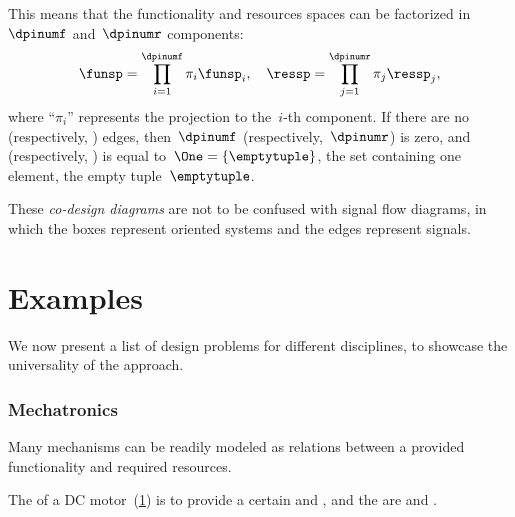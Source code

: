 
This means that the functionality and resources spaces can be factorized in~$\dpinumf$ and~$\dpinumr$ components:
\begin{equation*}
    \funsp=\prod_{i=1}^{\dpinumf}\pi_{i}\funsp_{i},\quad \ressp=\prod_{j=1}^{\dpinumr}\pi_{j}\ressp_{j},
\end{equation*}
where ``$\pi_{i}$'' represents the projection to the~$i$-th component.
If there are no  (respectively, ) edges, then~$\dpinumf$ (respectively,~$\dpinumr$) is zero, and \funsp (respectively, \ressp) is equal to~$\One=\{\emptytuple \}$, the set containing one element, the empty tuple~$\emptytuple$.

These \emph{co-design diagrams} are not to be confused with signal flow diagrams, in which the boxes represent oriented systems and the edges represent signals.




\section{Examples}
We now present a list of design problems for different disciplines, to showcase the universality of the approach.

\subsubsection{Mechatronics}
Many mechanisms can be readily modeled as relations between a provided functionality and required resources.

\begin{example}
    The  of a DC motor~(\cref{fig:dc_motor}) is to provide a certain  and , and the  are  and .
\end{example}

\begin{figure}[h]
    \begin{center}
    \end{center}
    \caption{\label{fig:dc_motor}}
\end{figure}



